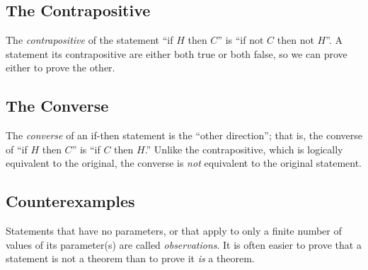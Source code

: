 \documentclass[]{article}
\begin{document}
  \subsection*{The Contrapositive}
    The \emph{contrapositive} of the statement ``if $H$ then $C$'' is ``if not
    $C$ then not $H$''. A statement its contrapositive are either both true or
    both false, so we can prove either to prove the other.
    
  \subsection*{The Converse}
    The \emph{converse} of an if-then statement is the ``other direction''; 
    that is, the converse of ``if $H$ then $C$'' is ``if $C$ then $H$.'' 
    Unlike the contrapositive, which is logically equivalent to the original, 
    the converse is \emph{not} equivalent to the original statement.
  
  \subsection*{Counterexamples}
    Statements that have no parameters, or that apply to only a finite number
    of values of its parameter(s) are called \emph{observations}. It is often
    easier to prove that a statement is not a theorem than to prove it 
    \emph{is} a theorem.
\end{document}
